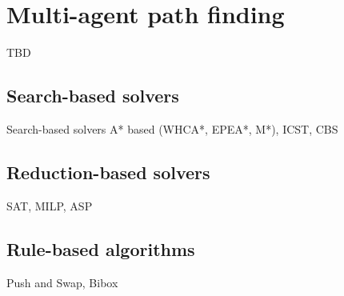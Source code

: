 \section{Multi-agent path finding}
TBD
\subsection{Search-based solvers}
Search-based solvers
A* based (WHCA*, EPEA*, M*), ICST, CBS 

\subsection{Reduction-based solvers}
SAT, MILP, ASP

\subsection{Rule-based algorithms}
Push and Swap, Bibox